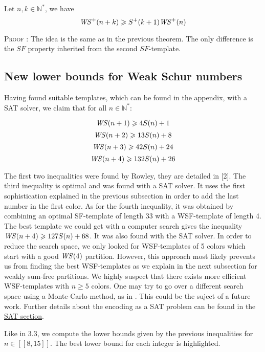 \begin{corollary}
	Let \(n, k \in \mathbb{N}^*\), we have \\
	\[ \mathit{WS}^+(n+k) \geqslant S^+(k+1) \mathit{WS}^+(n) \]
\end{corollary}

\textsc{Proof :} The idea is the same as in the previous theorem. The only difference is the \(SF\) property inherited
from the second \(SF\)-template.



\subsection{New lower bounds for Weak Schur numbers}
Having found suitable templates, which can be found in the appendix, with a SAT solver, we claim that for all \(n \in
\mathbb{N}^*\):

\[
\mathit{WS}(n+1) \geqslant 4S(n) + 1 
\]
\[
\mathit{WS}(n+2) \geqslant 13S(n) + 8
\]
\[
\mathit{WS}(n+3) \geqslant 42S(n) + 24
\]
\[
\mathit{WS}(n+4) \geqslant 132S(n) + 26
\]

The first two inequalities were found by Rowley, they are detailed in [2]. The third inequality is optimal and was found with a SAT solver.
It uses the first sophistication explained in the previous subsection in order to add the last number in the first color.
As for the fourth inequality, it was obtained by combining an optimal SF-template of length 33 with a WSF-template of length 4.
The best template we could get with a computer search gives the inequality \(\mathit{WS}(n+4) \geqslant 127 S(n) + 68\).
It was also found with the SAT solver. In order to reduce the search space, we only looked for WSF-templates of
5 colors which start with a good \(\mathit{WS}(4)\) partition. However, this approach most likely prevents us from finding the best WSF-templates
as we explain in the next subsection for weakly sum-free partitions. We highly suspect that there exists more efficient WSF-templates
with \(n \geqslant 5\) colors. One may try to go over a different search space using a Monte-Carlo method, as in \cite{Bouzy2015AnAP}.
This could be the suject of a future work. Further details about the encoding as a SAT problem can be found in the
\hyperref[SAT]{SAT section}.

Like in 3.3, we compute the lower bounds given by the previous inequalities for \( n \in [\![8,15]\!] \). The best lower bound
for each integer is highlighted.

